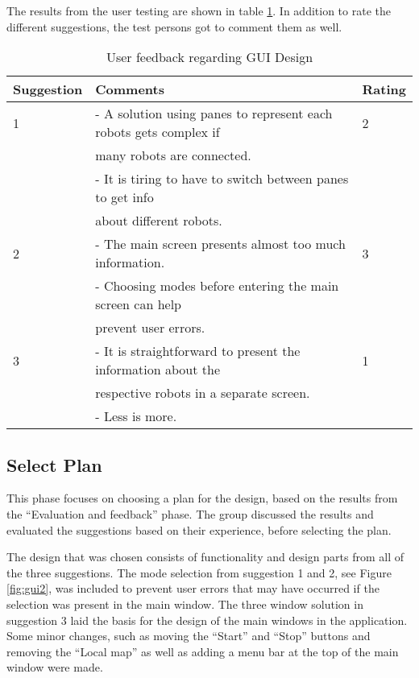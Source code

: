 The results from the user testing are shown in table \ref{tab:guifeedback}. In addition to rate the different suggestions, the test persons got to comment them as well.

\begin{table}[ht]
\begin{center}
\begin{tabular}{|l|l|l|} 
\hline
Suggestion  &   Comments & Rating \\
 \hline
1           &   - A solution using panes to represent each robots gets complex if & 2\\
            &   many robots are connected. & \\
            &   - It is tiring to have to switch between panes to get info &\\
            &   about different robots. & \\
\hline
2           &   - The main screen presents almost too much information.  & 3\\
            &   - Choosing modes before entering the main screen can help &\\
            &   prevent user errors.  &\\
\hline
3           &   - It is straightforward to present the information about the & 1\\
            &   respective robots in a separate screen.  &\\
            &   - Less is more.  &\\
\hline
\end{tabular}
\end{center}
\caption{User feedback regarding GUI Design}
\label{tab:guifeedback}
\end{table}


\subsection{Select Plan}
\label{sec:selectplan}
This phase focuses on choosing a plan for the design, based on the results from the ``Evaluation and feedback'' phase. The group discussed the results and evaluated the suggestions based on their experience, before selecting the plan.

The design that was chosen consists of functionality and design parts from all of the three suggestions. The mode selection from suggestion 1 and 2, see Figure \ref{fig:gui2}, was included to prevent user errors that may have occurred if the selection was present in the main window. The three window solution in suggestion 3 laid the basis for the design of the main windows in the application. Some minor changes, such as moving the ``Start'' and ``Stop'' buttons and removing the ``Local map'' as well as adding a menu bar at the top of the main window were made. 